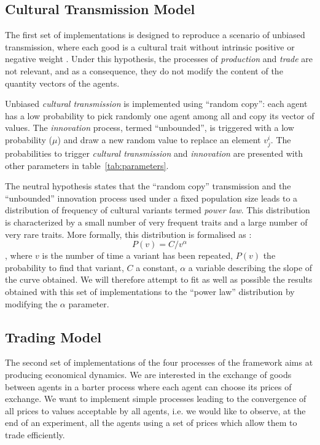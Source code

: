 \documentclass{wscpaperproc}
\begin{document}
\subsection{Cultural Transmission Model}\label{sec:culturalTrans}

The first set of implementations is designed to reproduce a scenario of unbiased transmission, where each good is a cultural trait without intrinsic positive or negative weight \cite{bentley_random_2004,bentley_specialisation_2005,mesoudi_random_2009}. 
Under this hypothesis, the processes of \emph{production} and \emph{trade} are not relevant, and as a consequence, they do not modify the content of the quantity vectors of the agents.

Unbiased \emph{cultural transmission} is implemented using ``random copy'': each agent has a low probability to pick randomly one agent among all and copy its vector of values. The \emph{innovation} process, termed ``unbounded'', is triggered with a low probability ($\mu$) and draw a new random value to replace an element $v^i_j$. The probabilities to trigger \emph{cultural transmission} and \emph{innovation} are presented with other parameters in table~\ref{tab:parameters}.

The neutral hypothesis states that the ``random copy'' transmission and the ``unbounded'' innovation process used under a fixed population size leads to a distribution of frequency of cultural variants termed \emph{power law}. This distribution is characterized by a small number of very frequent traits and a large number of very rare traits. 
More formally, this distribution is formalised as : $$P(v)=C/v^\alpha $$, where $v$ is the number of time a variant has been repeated, $P(v)$ the probability to find that variant, $C$ a constant, $\alpha$ a variable describing the slope of the curve obtained. We will therefore attempt to fit as well as possible the results obtained with this set of implementations to the ``power law'' distribution by modifying the $\alpha$ parameter.

\subsection{Trading Model}\label{sec:trade}

The second set of implementations of the four processes of the framework aims at producing economical dynamics. We are interested in the exchange of goods between agents in a barter process where each agent can choose its prices of exchange. We want to implement simple processes leading to the convergence of all prices to values acceptable by all agents, i.e. we would like to observe, at the end of an experiment, all the agents using a set of prices which allow them to trade efficiently.
\end{document}
